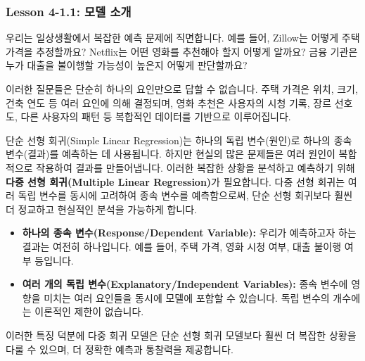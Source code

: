\documentclass[11pt,a4paper]{article}
\theoremstyle{definition}
\begin{document}
\subsubsection{Lesson 4-1.1: 모델 소개}

\begin{tcolorbox}[title=\textbf{다중 선형 회귀의 필요성}]
우리는 일상생활에서 복잡한 예측 문제에 직면합니다. 예를 들어, Zillow는 어떻게 주택 가격을 추정할까요? Netflix는 어떤 영화를 추천해야 할지 어떻게 알까요? 금융 기관은 누가 대출을 불이행할 가능성이 높은지 어떻게 판단할까요?

이러한 질문들은 단순히 하나의 요인만으로 답할 수 없습니다. 주택 가격은 위치, 크기, 건축 연도 등 여러 요인에 의해 결정되며, 영화 추천은 사용자의 시청 기록, 장르 선호도, 다른 사용자의 패턴 등 복합적인 데이터를 기반으로 이루어집니다.

단순 선형 회귀(Simple Linear Regression)는 하나의 독립 변수(원인)로 하나의 종속 변수(결과)를 예측하는 데 사용됩니다. 하지만 현실의 많은 문제들은 여러 원인이 복합적으로 작용하여 결과를 만들어냅니다. 이러한 복잡한 상황을 분석하고 예측하기 위해 \textbf{다중 선형 회귀(Multiple Linear Regression)}가 필요합니다. 다중 선형 회귀는 여러 독립 변수를 동시에 고려하여 종속 변수를 예측함으로써, 단순 선형 회귀보다 훨씬 더 정교하고 현실적인 분석을 가능하게 합니다.
\end{tcolorbox}

\begin{tcolorbox}[title=\textbf{다중 선형 회귀 모델의 특징}]
\begin{itemize}
    \item \textbf{하나의 종속 변수(Response/Dependent Variable):} 우리가 예측하고자 하는 결과는 여전히 하나입니다. 예를 들어, 주택 가격, 영화 시청 여부, 대출 불이행 여부 등입니다.
    \item \textbf{여러 개의 독립 변수(Explanatory/Independent Variables):} 종속 변수에 영향을 미치는 여러 요인들을 동시에 모델에 포함할 수 있습니다. 독립 변수의 개수에는 이론적인 제한이 없습니다.
\end{itemize}
이러한 특징 덕분에 다중 회귀 모델은 단순 선형 회귀 모델보다 훨씬 더 복잡한 상황을 다룰 수 있으며, 더 정확한 예측과 통찰력을 제공합니다.
\end{tcolorbox}
\end{document}
